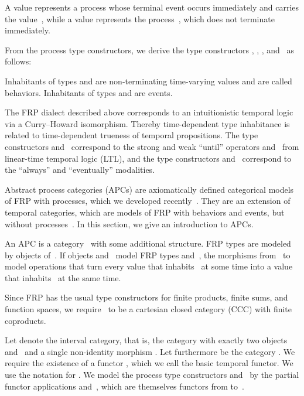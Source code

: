 \documentclass[copyright,creativecommons]{eptcs}
\begin{document}
A value  represents a process whose terminal event occurs immediately and
carries the value~, while a value  represents the process~, which
does not terminate immediately.

From the process type constructors, we derive the type constructors , ,
, and~ as follows:

Inhabitants of types  and  are non-terminating time-varying values and
are called behaviors. Inhabitants of types  and  are events.

The FRP dialect described above corresponds to an intuitionistic temporal logic
via a Curry–Howard isomorphism. Thereby time-dependent type inhabitance is
related to time-dependent trueness of temporal propositions. The type
constructors  and~ correspond to the strong and weak “until” operators
 and~ from linear-time temporal logic (LTL), and the type constructors 
and~ correspond to the “always” and “eventually” modalities.


Abstract process categories (APCs) are axiomatically defined categorical models
of FRP with processes, which we developed recently~\cite{jeltsch:plpv-2014}.
They are an extension of temporal categories, which are models of FRP with
behaviors and events, but without processes~\cite{jeltsch:entcs-286}. In this
section, we give an introduction to APCs.


An APC is a category~ with some additional structure. FRP types are modeled
by objects of~. If objects  and~ model FRP types  and~, the
morphisms from~ to~ model operations that turn every value that
inhabits~ at some time into a value that inhabits~ at the same time.

Since FRP has the usual type constructors for finite products, finite sums, and
function spaces, we require~ to be a cartesian closed category (CCC) with
finite coproducts.


Let  denote the interval category, that is, the category with exactly two
objects  and~ and a single non-identity morphism . Let
furthermore  be the category . We require the existence of a
functor , which we call the basic temporal functor. We use the
notation  for . We model the process type constructors
 and~ by the partial functor applications  and~, which are
themselves functors from  to~.
\end{document}
